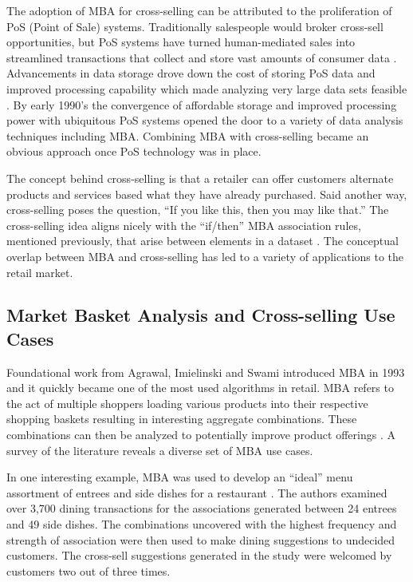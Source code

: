 \documentclass[../article.tex, 12pt]{subfiles}
\begin{document}
\begin{multicols*}{2}
The adoption of MBA for cross-selling can be attributed to the proliferation of PoS (Point of Sale) systems. Traditionally salespeople would broker cross-sell opportunities, but PoS systems have turned human-mediated sales into streamlined transactions that collect and store vast amounts of consumer data \citep{kamakura2008cross}. Advancements in data storage drove down the cost of storing PoS data and improved processing capability which made analyzing very large data sets feasible \citep{avcilar2014association}. By early 1990's the convergence of affordable storage and improved processing power with ubiquitous PoS systems opened the door to a variety of data analysis techniques including MBA. Combining MBA with cross-selling became an obvious approach once PoS technology was in place.

\par
The concept behind cross-selling is that a retailer can offer customers alternate products and services based what they have already purchased. Said another way, cross-selling poses the question, ``If you like this, then you may like that.'' The cross-selling idea aligns nicely with the ``if/then'' MBA association rules, mentioned previously, that arise between elements in a dataset \citep{agrawal1994fast}. The conceptual overlap between MBA and cross-selling has led to a variety of applications to the retail market.

\subsection{Market Basket Analysis and Cross-selling Use Cases}

Foundational work from Agrawal, Imielinski and Swami introduced MBA in 1993 and it quickly became one of the most used algorithms in retail. MBA refers to the act of multiple shoppers loading various products into their respective shopping baskets resulting in interesting aggregate combinations. These combinations can then be analyzed to potentially improve product offerings \citep{avcilar2014association}. A survey of the literature reveals a diverse set of MBA use cases.

\par
In one interesting example, MBA was used to develop an ``ideal'' menu assortment of entrees and side dishes for a restaurant \citep{ting2010finding}. The authors examined over 3,700 dining transactions for the associations generated between 24 entrees and 49 side dishes. The combinations uncovered with the highest frequency and strength of association were then used to make dining suggestions to undecided customers. The cross-sell suggestions generated in the study were welcomed by customers two out of three times.


\end{multicols*}
\end{document}
